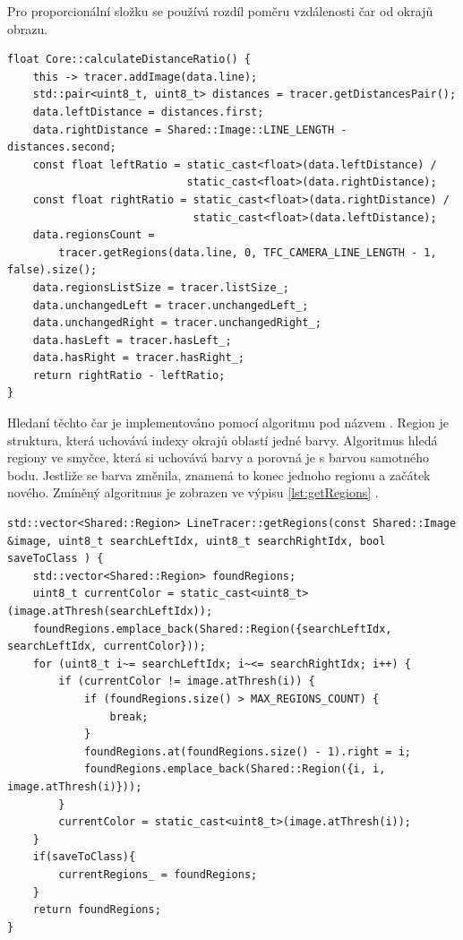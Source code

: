 Pro proporcionální složku se používá rozdíl poměru vzdálenosti čar od okrajů obrazu.
\begin{lstlisting}[caption = Kalkulace poměru vzdálenosti čar, label = lst:calculateDistanceRatio]
float Core::calculateDistanceRatio() {
    this -> tracer.addImage(data.line);
    std::pair<uint8_t, uint8_t> distances = tracer.getDistancesPair();
    data.leftDistance = distances.first;
    data.rightDistance = Shared::Image::LINE_LENGTH - distances.second;
    const float leftRatio = static_cast<float>(data.leftDistance) /
                            static_cast<float>(data.rightDistance);
    const float rightRatio = static_cast<float>(data.rightDistance) /
                             static_cast<float>(data.leftDistance);
    data.regionsCount =
        tracer.getRegions(data.line, 0, TFC_CAMERA_LINE_LENGTH - 1, false).size();
    data.regionsListSize = tracer.listSize_;
    data.unchangedLeft = tracer.unchangedLeft_;
    data.unchangedRight = tracer.unchangedRight_;
    data.hasLeft = tracer.hasLeft_;
    data.hasRight = tracer.hasRight_;
    return rightRatio - leftRatio;
}
\end{lstlisting}

Hledaní těchto čar je implementováno pomocí algoritmu pod názvem . Region je struktura, která uchovává indexy okrajů oblastí jedné barvy.
Algoritmus hledá regiony ve smyčce, která si uchovává barvy a porovná je s barvou
samotného bodu. Jestliže se barva změnila, znamená to konec jednoho regionu
a začátek nového. Zmíněný algoritmus je zobrazen ve výpisu \ref{lst:getRegions} 
\cite{robot}.

\begin{lstlisting}[caption = Algoritmus hledání regionu, label = lst:getRegions]
std::vector<Shared::Region> LineTracer::getRegions(const Shared::Image &image, uint8_t searchLeftIdx, uint8_t searchRightIdx, bool saveToClass ) {
	std::vector<Shared::Region> foundRegions;
	uint8_t currentColor = static_cast<uint8_t>(image.atThresh(searchLeftIdx));
	foundRegions.emplace_back(Shared::Region({searchLeftIdx, searchLeftIdx, currentColor}));
	for (uint8_t i~= searchLeftIdx; i~<= searchRightIdx; i++) {
		if (currentColor != image.atThresh(i)) {
			if (foundRegions.size() > MAX_REGIONS_COUNT) {
				break;
			}
			foundRegions.at(foundRegions.size() - 1).right = i;
			foundRegions.emplace_back(Shared::Region({i, i, image.atThresh(i)}));
		}
		currentColor = static_cast<uint8_t>(image.atThresh(i));
	}
	if(saveToClass){
		currentRegions_ = foundRegions;
	}
	return foundRegions;
}
\end{lstlisting}

